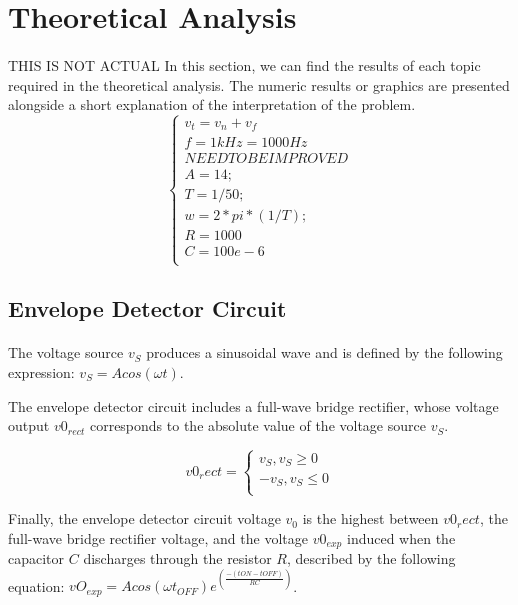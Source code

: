\section{Theoretical Analysis}
\label{sec:analysis}

\paragraph{}
THIS IS NOT ACTUAL
In this section, we can find the results of each topic required in the theoretical analysis. The numeric results or graphics are presented alongside a short explanation of the interpretation of the problem.\\
\[
\left\{\begin{matrix}
v_t=v_n+v_f\\
f = 1 kHz = 1000 Hz \\
NEED TO BE IMPROVED \\
A=14;\\
T=1/50;\\
w=2*pi*(1/T);\\
R=1000\\
C=100e-6\\
\end{matrix}\right.
\]

\subsection{Envelope Detector Circuit}
\label{subsec:envelope}

\paragraph{}
The voltage source $v_S$ produces a sinusoidal wave and is defined by the following expression: $v_S=Acos(\omega t)$.

The envelope detector circuit includes a full-wave bridge rectifier, whose voltage output $v0_{rect}$ corresponds to the absolute value of the voltage source $v_S$.

\[
v0_rect =
\left\{\begin{matrix}
v_S, v_S \ge 0\\
-v_S, v_S \le 0\\
\end{matrix}\right.
\]

Finally, the envelope detector circuit voltage $v_0$ is the highest between $v0_rect$, the full-wave bridge rectifier voltage, and the voltage $v0_{exp}$ induced when the capacitor $C$ discharges through the resistor $R$, described by the following equation: $vO_{exp}=Acos(\omega t_{OFF})e^(\frac{-({tON}-{tOFF})}{RC})$.

